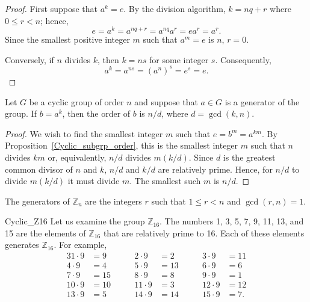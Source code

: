  
\begin{proof}
First suppose that $a^k=e$. By the division algorithm, $k = nq + r$
where $0 \leq r < n$; hence, 
\[
e = a^k = a^{nq + r} = a^{nq} a^r = e a^r = a^r.
\]
Since the smallest positive integer $m$ such that $a^m = e$ is $n$, $r
= 0$.
 
 
Conversely, if $n$ divides $k$, then $k=ns$ for some integer $s$.
Consequently, 
\[
a^k = a^{ns} = (a^n)^s = e^s = e.
\]
\end{proof}
 
 
\begin{theorem}
Let $G$ be a cyclic group of order $n$ and suppose that $a \in G$ is a
generator of the group.  If $b = a^k$, then the order of $b$ is $n
/d$, where $d = \gcd(k,n)$. 
\end{theorem}
 
 
\begin{proof}
We wish to find the smallest integer $m$ such that $e = b^m = a^{km}$.
By Proposition~\ref{Cyclic_subgrp_order}, this is the smallest integer $m$ such that
$n$ divides $km$ or, equivalently, $n/d$ divides $m(k/d)$.  Since $d$ is
the greatest common divisor of $n$ and $k$, $n/d$ and $k/d$ are
relatively prime. Hence, for $n/d$ to divide $m(k/d)$ it must divide
$m$.  The smallest such $m$ is $n/d$. 
\end{proof}
 
 
\begin{corollary}
The generators of ${\mathbb Z}_n$ are the integers $r$ such that $1 \leq
r < n$ and $\gcd(r,n) =  1$. 
\end{corollary}
 
 
\begin{example}{Cyclic_Z16}
Let us examine the group ${\mathbb Z}_{16}$.  The numbers 1, 3, 5, 7, 9,
11, 13, and 15 are the elements of ${\mathbb Z}_{16}$ that are relatively
prime to 16.  Each of these elements generates ${\mathbb Z}_{16}$. For
example, 
\begin{alignat*}{3}
1 \cdot 9  & =  9  & \qquad 2 \cdot 9  & = 2  & \qquad 3 \cdot 9  & = 11 \\
4 \cdot 9  & =  4  & \qquad 5 \cdot 9  & = 13 & \qquad	6 \cdot 9 & = 6  \\
7 \cdot 9  & =  15 & \qquad 8 \cdot 9  & = 8  & \qquad	9 \cdot 9 &  = 1  \\
10 \cdot 9 & =  10 & \qquad 11 \cdot 9 & = 3  & \qquad	12 \cdot 9 &  = 12 \\
13 \cdot 9 & =  5 &  \qquad 14 \cdot 9 & = 14 &  \qquad	15 \cdot 9 & = 7.
\end{alignat*}
\end{example}
 
